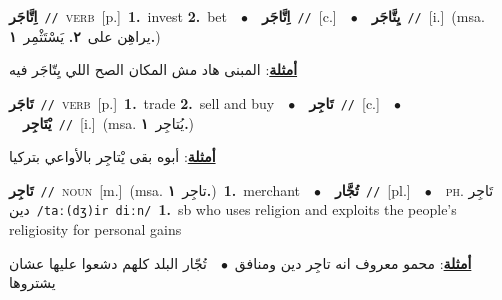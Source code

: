 \documentclass[10pt,a4paper,twoside]{article} %
\begin{document}
\begin{multicols}{2}
{\setlength\topsep{0pt}\textbf{\foreignlanguage{arabic}{اِتَّاجَر}}\ {\color{gray}\texttt{//}\color{black}}\ \textsc{verb}\ [p.]\ \textbf{1.}~invest  \textbf{2.}~bet\ \ $\bullet$\ \ \setlength\topsep{0pt}\textbf{\foreignlanguage{arabic}{اِتَّاجَر}}\ {\color{gray}\texttt{//}\color{black}}\ [c.]\ \ $\bullet$\ \ \setlength\topsep{0pt}\textbf{\foreignlanguage{arabic}{يِتَّاجَر}}\ {\color{gray}\texttt{//}\color{black}}\ [i.]\ \color{gray}(msa. \foreignlanguage{arabic}{يراهِن على}~\foreignlanguage{arabic}{\textbf{٢.}}  \foreignlanguage{arabic}{يَسْتَثْمِر}~\foreignlanguage{arabic}{\textbf{١.}})\color{black}\  \begin{flushright}\color{gray}\foreignlanguage{arabic}{\textbf{\underline{\foreignlanguage{arabic}{أمثلة}}}: المبنى هاد مش المكان الصح اللي يِتّاجَر فيه}\end{flushright}\color{black}} \vspace{2mm}

{\setlength\topsep{0pt}\textbf{\foreignlanguage{arabic}{تَاجَر}}\ {\color{gray}\texttt{//}\color{black}}\ \textsc{verb}\ [p.]\ \textbf{1.}~trade  \textbf{2.}~sell and buy\ \ $\bullet$\ \ \setlength\topsep{0pt}\textbf{\foreignlanguage{arabic}{تَاجِر}}\ {\color{gray}\texttt{//}\color{black}}\ [c.]\ \ $\bullet$\ \ \setlength\topsep{0pt}\textbf{\foreignlanguage{arabic}{يْتَاجِر}}\ {\color{gray}\texttt{//}\color{black}}\ [i.]\ \color{gray}(msa. \foreignlanguage{arabic}{يُتاجِر}~\foreignlanguage{arabic}{\textbf{١.}})\color{black}\  \begin{flushright}\color{gray}\foreignlanguage{arabic}{\textbf{\underline{\foreignlanguage{arabic}{أمثلة}}}: أبوه بقى يْتاجِر بالأواعي بتركيا}\end{flushright}\color{black}} \vspace{2mm}

{\setlength\topsep{0pt}\textbf{\foreignlanguage{arabic}{تَاجِر}}\ {\color{gray}\texttt{//}\color{black}}\ \textsc{noun}\ [m.]\ \color{gray}(msa. \foreignlanguage{arabic}{تاجِر}~\foreignlanguage{arabic}{\textbf{١.}})\color{black}\ \textbf{1.}~merchant\ \ $\bullet$\ \ \setlength\topsep{0pt}\textbf{\foreignlanguage{arabic}{تُجَّار}}\ {\color{gray}\texttt{//}\color{black}}\ [pl.]\ \ $\bullet$\ \ \textsc{ph.} \color{gray} \foreignlanguage{arabic}{تَاجِر دين}\color{black}\ {\color{gray}\texttt{/{\sffamily taː(dʒ)ir diːn}/}\color{black}}\ \textbf{1.}~sb who uses religion and exploits the people's religiosity for personal gains\  \begin{flushright}\color{gray}\foreignlanguage{arabic}{\textbf{\underline{\foreignlanguage{arabic}{أمثلة}}}: محمو معروف انه تاجِر دين ومنافق\ $\bullet$\ \  تُجّار البلد كلهم دشعوا عليها عشان يشتروها}\end{flushright}\color{black}} \vspace{2mm}


\end{multicols}
\end{document}
